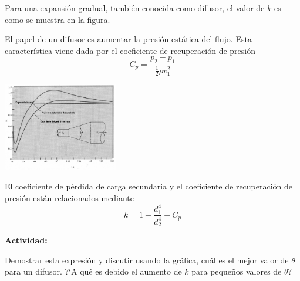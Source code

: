 \begin{minipage}{10cm}
	Para una expansión gradual, también conocida como difusor, el valor de $k$ es como se muestra en la figura.
	
	El papel de un difusor es aumentar la presión estática del flujo. Esta caracter\'istica viene dada por el coeficiente de recuperación de presión
	\[C_p = \frac{p_2-p_1}{\frac{1}{2}\rho v_1^2}\]
\end{minipage}
\begin{minipage}{10cm}
	\begin{center}
		\includegraphics[width=5cm]{TeX_files/chapter10-Tuberias/difusor.png}
	\end{center}
\end{minipage}


El coeficiente de pérdida de carga secundaria y el coeficiente de recuperación de presión están relacionados mediante
\[k = 1- \frac{d_1^4}{d_2^4}-C_p\]

\textbf{Actividad:}

Demostrar esta expresión y discutir usando la gráfica, cuál es el mejor valor de $\theta$ para un difusor. ?`A qué es debido el aumento de $k$ para peque\~nos valores de $\theta$?
